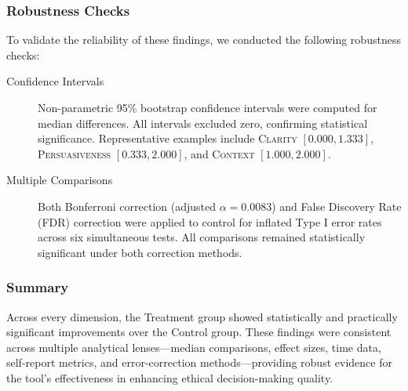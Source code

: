 \subsubsection*{Robustness Checks}

To validate the reliability of these findings, we conducted the following robustness checks:

\begin{description}
  \item[Confidence Intervals] Non-parametric 95\% bootstrap confidence intervals were computed for median differences. All intervals excluded zero, confirming statistical significance. Representative examples include \textsc{Clarity} $[0.000, 1.333]$, \textsc{Persuasiveness} $[0.333, 2.000]$, and \textsc{Context} $[1.000, 2.000]$.

  \item[Multiple Comparisons] Both Bonferroni correction (adjusted $\alpha = 0.0083$) and False Discovery Rate (FDR) correction were applied to control for inflated Type I error rates across six simultaneous tests. All comparisons remained statistically significant under both correction methods.
\end{description}

\subsubsection*{Summary}

Across every dimension, the Treatment group showed statistically and practically significant improvements over the Control group. These findings were consistent across multiple analytical lenses—median comparisons, effect sizes, time data, self-report metrics, and error-correction methods—providing robust evidence for the tool's effectiveness in enhancing ethical decision-making quality.

